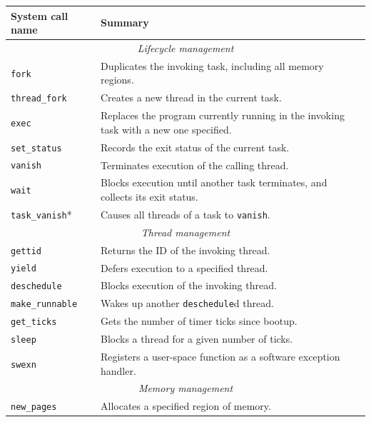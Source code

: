 \begin{table}
        \center
        \begin{tabular}{|l|p{}|}
                \hline
                \bf System call name & \bf Summary \\
                \hline
                \multicolumn{2}{c}{\em Lifecycle management} \\
                \hline
                \texttt{fork} & Duplicates the invoking task, including all memory regions. \\
                \texttt{thread\_fork} & Creates a new thread in the current task.\\
                \texttt{exec} & Replaces the program currently running in the invoking task with a new one specified. \\
                \texttt{set\_status} & Records the exit status of the current task. \\
                \texttt{vanish} & Terminates execution of the calling thread. \\
                \texttt{wait} & Blocks execution until another task terminates, and collects its exit status.\\
                \texttt{task\_vanish}* & Causes all threads of a task to \texttt{vanish}. \\
                \hline
                \multicolumn{2}{c}{\em Thread management} \\
                \hline
                \texttt{gettid} & Returns the ID of the invoking thread. \\
                \texttt{yield} & Defers execution to a specified thread. \\
                \texttt{deschedule} & Blocks execution of the invoking thread. \\
                \texttt{make\_runnable} & Wakes up another \texttt{deschedule}d thread. \\
                \texttt{get\_ticks} & Gets the number of timer ticks since bootup. \\
                \texttt{sleep} & Blocks a thread for a given number of ticks. \\
                \texttt{swexn} & Registers a user-space function as a software exception handler.\\
                \hline
                \multicolumn{2}{c}{\em Memory management} \\
                \hline
                \texttt{new\_pages} & Allocates a specified region of memory. \\

\end{tabular}
\end{table}
